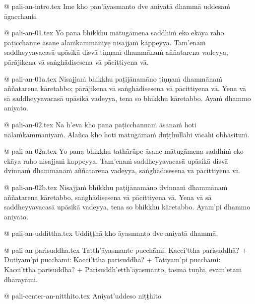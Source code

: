 @ pali-an-intro.tex
Ime kho pan’āyasmanto dve aniyatā dhammā uddesaṁ āgacchanti.

@ pali-an-01.tex
Yo pana bhikkhu mātugāmena saddhiṁ eko ekāya raho paṭicchanne āsane alaṁkammaniye nisajjaṁ kappeyya. Tam’enaṁ saddheyyavacasā upāsikā disvā tiṇṇaṁ dhammānaṁ aññatarena vadeyya; pārājikena vā saṅghādisesena vā pācittiyena vā. 

@ pali-an-01a.tex
Nisajjaṁ bhikkhu paṭijānamāno tiṇṇaṁ dhammānaṁ aññatarena kāretabbo; pārājikena vā saṅghādisesena vā pācittiyena vā. Yena vā sā saddheyyavacasā upāsikā vadeyya, tena so bhikkhu kāretabbo. Ayaṁ dhammo aniyato.

@ pali-an-02.tex
Na h’eva kho pana paṭicchannaṁ āsanaṁ hoti nālaṁkammaniyaṁ. Alañca kho hoti mātugāmaṁ duṭṭhullāhi vācāhi obhāsituṁ.

@ pali-an-02a.tex
Yo pana bhikkhu tathārūpe āsane mātugāmena saddhiṁ eko ekāya raho nisajjaṁ kappeyya. Tam’enaṁ saddheyyavacasā upāsikā disvā dvinnaṁ dhammānaṁ aññatarena vadeyya, saṅghādisesena vā pācittiyena vā.

@ pali-an-02b.tex
Nisajjaṁ bhikkhu paṭijānamāno dvinnaṁ dhammānaṁ aññatarena kāretabbo, saṅghādisesena vā pācittiyena vā. Yena vā sā saddheyyavacasā upāsikā vadeyya, tena so bhikkhu kāretabbo. Ayam’pi dhammo aniyato.

@ pali-an-uddittha.tex
Uddiṭṭhā kho āyasmanto dve aniyatā dhammā.

@ pali-an-parisuddha.tex
Tatth’āyasmante pucchāmi: Kacci’ttha parisuddhā? +
Dutiyam’pi pucchāmi: Kacci’ttha parisuddhā? +
Tatiyam’pi pucchāmi: Kacci’ttha parisuddhā? +
Parisuddh’etth’āyasmanto, tasmā tuṇhī, evam’etaṁ dhārayāmi.

@ pali-center-an-nitthito.tex
Aniyat’uddeso niṭṭhito
